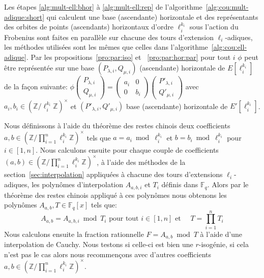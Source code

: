 \documentclass[10pt,a4paper]{book}
\theoremstyle{plain}
\theoremstyle{definition}
\theoremstyle{definition}
\theoremstyle{definition}
\theoremstyle{definition}
\theoremstyle{definition}
\theoremstyle{remark}
\theoremstyle{remark}
\theoremstyle{definition}
\begin{document}
Les étapes \ref{alg:mult-ell:bhor} à \ref{alg:mult-ell:rep} de 
l'algorithme~\ref{alg:cou:mult-adique:short} qui calculent une base (ascendante) 
horizontale et des représentants des orbites de points (ascendants) 
horizontaux d'ordre $\ell_i^{k_i}$ sous l'action du Frobenius sont faites en 
parallèle sur chacune des tours d'extension $\ell_i$-adiques, les méthodes 
utilisées sont les mêmes que celles dans l'algorithme~\ref{alg:cou:ell-adique}.
Par les propositions~\ref{pro:par:iso} et ~\ref{pro:par:hor:par} pour tout $i$ 
$\phi$ peut être représentée sur une base $(P_{\lambda,i},Q_{\mu,i})$ (ascendante) 
horizontale de $E[\ell_i^{k_i}]$  de la façon suivante:
$
\phi
\left(\begin{smallmatrix}
P_{\lambda,i} \\
Q_{\mu,i} 
\end{smallmatrix} \right)= \left(\begin{smallmatrix}
a_i & 0 \\
0 & b_i\end{smallmatrix} \right)
\left(\begin{smallmatrix}
P'_{\lambda,i} \\
Q'_{\mu,i} \end{smallmatrix} \right)$
avec $ a_i,b_i \in \left( \mathbb{Z}/\ell_i^{k_i}\mathbb{Z} \right)^{\times}$ et 
$(P'_{\lambda,i},Q'_{\mu,i})$
base (ascendante) horizontale de $E'[\ell_i^{k_i}]$.

Nous définissons à l'aide du théorème des restes chinois deux coefficients 
$a,b \in \left( \mathbb{Z}/\prod_{i=1}^n\ell_i^{k_i} \mathbb{Z} 
\right)^{\times}$ tels que 
$a=a_i \bmod \ell_i^{k_i}$ et $b=b_i \bmod \ell_i^{k_i}$ pour $i\in [1,n]$.
Nous calculons ensuite pour chaque couple de coefficients 
$(a,b) \in (\mathbb{Z}/\prod_{i=1}^n\ell_i^{k_i}\mathbb{Z})^{\times}$, à l'aide 
des méthodes de la section~\ref{sec:interpolation} appliquées
à chacune des tours d'extensions $\ell_i$-adiques, les polynômes 
d'interpolation $A_{a,b,i}$ et $T_i$ définis dans $\mathbb{F}_q$.
Alors  par le théorème des restes chinois appliqué à ces polynômes nous 
obtenons les polynômes $A_{a,b},T \in \mathbb{F}_q[x]$ tels que:
 \[
A_{a,b}=A_{a,b,i} \bmod T_i \text{ pour tout } i \in [1,n] \text{ et } \quad T=\prod_{i=1}^nT_i 
 \]
Nous calculons ensuite la fraction rationnelle $F=A_{a,b} \bmod T$ à l'aide 
d'une interpolation de Cauchy. Nous testons si celle-ci est bien une 
$r$-isogénie, si cela n'est pas le cas alors nous recommençons avec d'autres 
coefficients $a,b \in (\mathbb{Z}/\prod_{i=1}^n\ell_i^{k_i} \mathbb{Z})^{\times}$.
\end{document}
